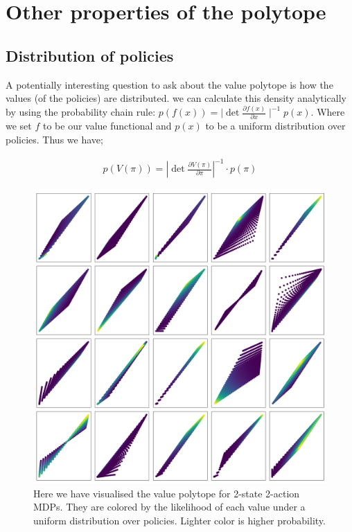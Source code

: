 \newpage

\section{Other properties of the polytope} \label{polytope-extras}



\subsection{Distribution of policies}

A potentially interesting question to ask about the value polytope is how the
values (of the policies) are distributed. we can calculate this
density analytically by using the probability chain rule:
\(p(f(x)) = \mid \det\frac{\partial f(x)}{\partial x}\mid^{-1}p(x)\).
Where we set \(f\) to be our value functional and \(p(x)\) to be a
uniform distribution over policies. Thus we have;

\begin{align}
p(V(\pi)) = |\det \frac{\partial V(\pi)}{\partial \pi}|^{-1} \cdot p(\pi) \tag{density}
\end{align}

\begin{figure}
\centering
\includegraphics[width=1\textwidth,height=1\textheight]{../../pictures/figures/polytope_densities.png}
\caption{Here we have visualised the value polytope for 2-state 2-action MDPs. They are colored by the likelihood of
each value under a uniform distribution over policies.
Lighter color is higher probability.}
\label{fig:density}
\end{figure}

